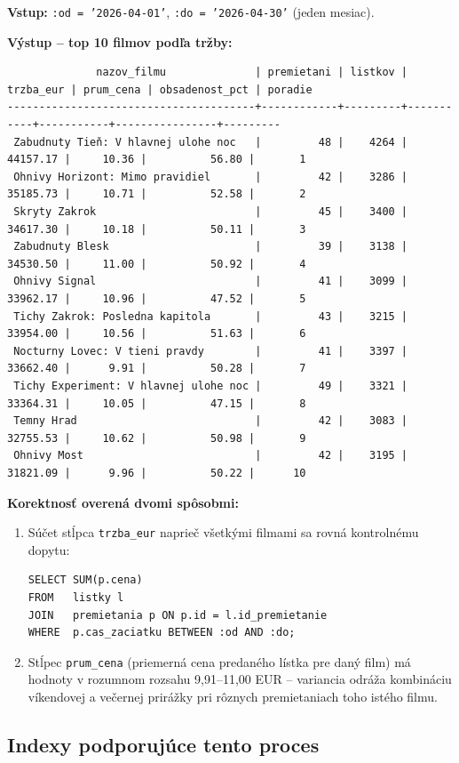 \documentclass[11pt, a4paper]{article}
\begin{document}
\textbf{Vstup:} \texttt{:od = '2026-04-01'}, \texttt{:do = '2026-04-30'}
(jeden mesiac).

\textbf{Výstup -- top 10 filmov podľa tržby:}
{\scriptsize
\begin{verbatim}
              nazov_filmu              | premietani | listkov | trzba_eur | prum_cena | obsadenost_pct | poradie
---------------------------------------+------------+---------+-----------+-----------+----------------+---------
 Zabudnuty Tieň: V hlavnej ulohe noc   |         48 |    4264 |  44157.17 |     10.36 |          56.80 |       1
 Ohnivy Horizont: Mimo pravidiel       |         42 |    3286 |  35185.73 |     10.71 |          52.58 |       2
 Skryty Zakrok                         |         45 |    3400 |  34617.30 |     10.18 |          50.11 |       3
 Zabudnuty Blesk                       |         39 |    3138 |  34530.50 |     11.00 |          50.92 |       4
 Ohnivy Signal                         |         41 |    3099 |  33962.17 |     10.96 |          47.52 |       5
 Tichy Zakrok: Posledna kapitola       |         43 |    3215 |  33954.00 |     10.56 |          51.63 |       6
 Nocturny Lovec: V tieni pravdy        |         41 |    3397 |  33662.40 |      9.91 |          50.28 |       7
 Tichy Experiment: V hlavnej ulohe noc |         49 |    3321 |  33364.31 |     10.05 |          47.15 |       8
 Temny Hrad                            |         42 |    3083 |  32755.53 |     10.62 |          50.98 |       9
 Ohnivy Most                           |         42 |    3195 |  31821.09 |      9.96 |          50.22 |      10
\end{verbatim}
}

\textbf{Korektnosť overená dvomi spôsobmi:}
\begin{enumerate}
    \item Súčet stĺpca \texttt{trzba\_eur} naprieč všetkými filmami sa
    rovná kontrolnému dopytu:
\begin{lstlisting}
SELECT SUM(p.cena)
FROM   listky l
JOIN   premietania p ON p.id = l.id_premietanie
WHERE  p.cas_zaciatku BETWEEN :od AND :do;
\end{lstlisting}
    \item Stĺpec \texttt{prum\_cena} (priemerná cena predaného lístka pre
    daný film) má hodnoty v rozumnom rozsahu 9,91--11,00 EUR -- variancia
    odráža kombináciu víkendovej a večernej prirážky pri rôznych
    premietaniach toho istého filmu.
\end{enumerate}

\subsection{Indexy podporujúce tento proces}
\end{document}
